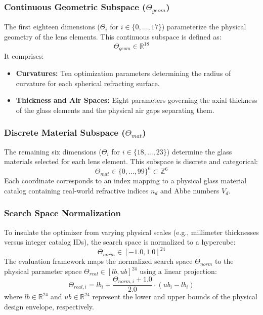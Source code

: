 \documentclass[12pt]{article}
\begin{document}
\subsubsection{Continuous Geometric Subspace ($\Theta_{geom}$)}
The first eighteen dimensions ($\Theta_i$ for $i \in \{0,\dots, 17\}$) parameterize the physical geometry of the lens elements. This continuous subspace is defined as:
\[ \Theta_{geom} \in \mathbb{R}^{18} \]
It comprises:
\begin{itemize}
    \item \textbf{Curvatures:} Ten optimization parameters determining the radius of curvature for each spherical refracting surface.
    \item \textbf{Thickness and Air Spaces:} Eight parameters governing the axial thickness of the glass elements and the physical air gaps separating them.
\end{itemize}

\subsubsection{Discrete Material Subspace ($\Theta_{mat}$)}
The remaining six dimensions ($\Theta_i$ for $i \in \{18, \dots, 23\}$) determine the glass materials selected for each lens element. This subspace is discrete and categorical:
\[ \Theta_{mat} \in  \{0, \dots, 99\}^6 \subset \mathbb{Z}^6 \]
Each coordinate corresponds to an index mapping to a physical glass material catalog containing real-world refractive indices $n_d$ and Abbe numbers $V_d$.

\subsubsection{Search Space Normalization}
To insulate the optimizer from varying physical scales (e.g., millimeter thicknesses versus integer catalog IDs), the search space is normalized to a hypercube:
\[ \Theta_{norm} \in [-1.0, 1.0]^{24} \]
The evaluation framework maps the normalized search space $\Theta_{norm}$ to the physical parameter space $\Theta_{real} \in [lb, ub]^{24}$ using a linear projection:
\[ \Theta_{real,i} = lb_i + \frac{\Theta_{norm,i} + 1.0}{2.0} \cdot (ub_i - lb_i) \]
where $lb \in \mathbb{R}^{24}$ and $ub \in \mathbb{R}^{24}$ represent the lower and upper bounds of the physical design envelope, respectively.
\end{document}
